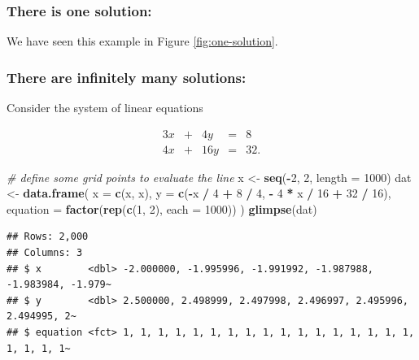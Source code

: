 \documentclass[
]{book}
\newenvironment{Shaded}{\begin{snugshade}}{\end{snugshade}}
\newcommand{\CommentTok}[1]{\textcolor[rgb]{0.56,0.35,0.01}{\textit{#1}}}
\newcommand{\DataTypeTok}[1]{\textcolor[rgb]{0.13,0.29,0.53}{#1}}
\newcommand{\DecValTok}[1]{\textcolor[rgb]{0.00,0.00,0.81}{#1}}
\newcommand{\KeywordTok}[1]{\textcolor[rgb]{0.13,0.29,0.53}{\textbf{#1}}}
\newcommand{\NormalTok}[1]{#1}
\newcommand{\OperatorTok}[1]{\textcolor[rgb]{0.81,0.36,0.00}{\textbf{#1}}}
\newcommand{\StringTok}[1]{\textcolor[rgb]{0.31,0.60,0.02}{#1}}
\theoremstyle{definition}
\theoremstyle{definition}
\theoremstyle{definition}
\theoremstyle{remark}
\begin{document}
\hypertarget{there-is-one-solution}{%
\subsubsection{There is one solution:}\label{there-is-one-solution}}

We have seen this example in Figure \ref{fig:one-solution}.

\hypertarget{there-are-infinitely-many-solutions}{%
\subsubsection{There are infinitely many solutions:}\label{there-are-infinitely-many-solutions}}

Consider the system of linear equations

\begin{alignat*}{3}
x   & {}+{} & 4 y & {}={} & 8 \\
4 x & {}+{} & 16 y & {}={} & 32.
\end{alignat*}

\begin{Shaded}
\begin{Highlighting}[]
\CommentTok{# define some grid points to evaluate the line}
\NormalTok{x <-}\StringTok{ }\KeywordTok{seq}\NormalTok{(}\OperatorTok{-}\DecValTok{2}\NormalTok{, }\DecValTok{2}\NormalTok{, }\DataTypeTok{length =} \DecValTok{1000}\NormalTok{)}
\NormalTok{dat <-}\StringTok{ }\KeywordTok{data.frame}\NormalTok{(}
    \DataTypeTok{x =} \KeywordTok{c}\NormalTok{(x, x),}
    \DataTypeTok{y =} \KeywordTok{c}\NormalTok{(}\OperatorTok{-}\NormalTok{x }\OperatorTok{/}\StringTok{ }\DecValTok{4} \OperatorTok{+}\StringTok{ }\DecValTok{8} \OperatorTok{/}\StringTok{ }\DecValTok{4}\NormalTok{, }\OperatorTok{-}\StringTok{ }\DecValTok{4} \OperatorTok{*}\StringTok{ }\NormalTok{x }\OperatorTok{/}\StringTok{ }\DecValTok{16} \OperatorTok{+}\StringTok{ }\DecValTok{32} \OperatorTok{/}\StringTok{ }\DecValTok{16}\NormalTok{),}
    \DataTypeTok{equation =} \KeywordTok{factor}\NormalTok{(}\KeywordTok{rep}\NormalTok{(}\KeywordTok{c}\NormalTok{(}\DecValTok{1}\NormalTok{, }\DecValTok{2}\NormalTok{), }\DataTypeTok{each =} \DecValTok{1000}\NormalTok{))}
\NormalTok{)}
\KeywordTok{glimpse}\NormalTok{(dat)}
\end{Highlighting}
\end{Shaded}

\begin{verbatim}
## Rows: 2,000
## Columns: 3
## $ x        <dbl> -2.000000, -1.995996, -1.991992, -1.987988, -1.983984, -1.979~
## $ y        <dbl> 2.500000, 2.498999, 2.497998, 2.496997, 2.495996, 2.494995, 2~
## $ equation <fct> 1, 1, 1, 1, 1, 1, 1, 1, 1, 1, 1, 1, 1, 1, 1, 1, 1, 1, 1, 1, 1~
\end{verbatim}
\end{document}
